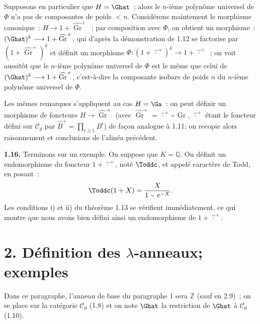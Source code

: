 Supposons en particulier que \(H=\Ghat\)~; alors le \(n\)-ième polynôme universel de \(\Phi\) n'a pas de composantes de poids \(<n\). Considérons maintement le morphisme canonique~: \(H\longrightarrow1+\widehat{\operatorname{Gr}}^{+}\)~; par composition avec \(\Phi\), on obtient un morphisme~: \((\Ghat)^k\longrightarrow1+\widehat{\operatorname{Gr}}^{+}\), qui d'après la démonstration de 1.12 se factorise par \((1+\widehat{\operatorname{Gr}}^{+})^k\) et définit un morphisme \(\Phi:(1+\widehat{\,\cdot\,}^{+})^k\longrightarrow1+\widehat{\,\cdot\,}^{+}\)~; on voit aussitôt que le \(n\)-ième polynôme universel de \(\Phi\) est le même que celui de \((\Ghat)^k\longrightarrow1+\widehat{\operatorname{Gr}}^{+}\), c'est-à-dire la composante isobare de poids \(n\) du \(n\)-ième polynôme universel de \(\Phi\).

Les mêmes remarques s'appliquent au cas \(H=\Ga\)~: on peut définir un morphisme de foncteurs \(H\longrightarrow\widehat{\operatorname{Gr}}^{+}\) (avec \(\widehat{\operatorname{Gr}}^{+}=\widehat{\,\cdot\,}^{+}\circ\operatorname{Gr}\), \(\widehat{\,\cdot\,}^{+}\) étant le foncteur défini sur \(\mathcal C_g\) par \(\widehat B^+=\prod_{i\geq1}B^i\)) de façon analogue à 1.11; on recopie alors raisonnement et conclusions de l'alinéa précédent.

\textbf{1.16.} Terminons sur un exemple. On suppose que \(K=\mathbb Q\). On définit un endomorphisme du foncteur \(1+\widehat{\,\cdot\,}^{+}\), noté \(\Toddc\), et appelé caractère de Todd, en posant~:
\[
  \Toddc(1+X)=\frac{X}{1-e^{-X}}.
\]
Les conditions i) et ii) du théorème 1.13 se vérifient immédiatement, ce qui montre que nous avons bien défini ainsi un endomorphisme de \(1+\widehat{\,\cdot\,}^{+}\).

\section*{2. Définition des \(\lambda\)-anneaux; exemples}

Dans ce paragraphe, l'anneau de base du paragraphe 1 sera \(\mathbb Z\) (sauf en 2.9)~; on se place sur la catégorie \(\mathcal C_0\) (1.8) et on note \(\Ghat\) la restriction de \(\Ghat\) à \(\mathcal C_0\) (1.10).

